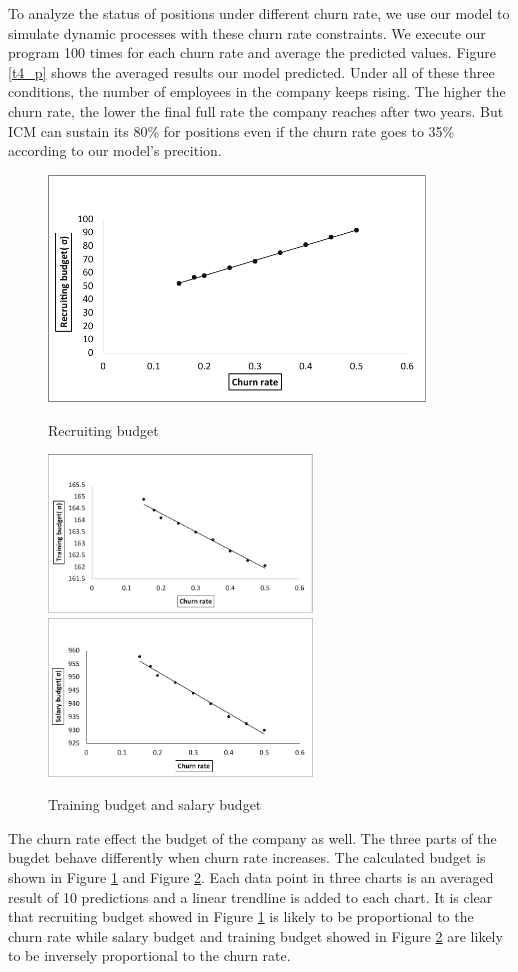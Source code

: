 \documentclass[12pt,a4paper,titlepage]{article}
\begin{document}
To analyze the status of positions under different churn rate, we use
our model to simulate dynamic processes with these churn rate
constraints. We execute our program 100 times for each churn rate and
average the predicted values. Figure \ref{t4_p} shows the averaged
results our model predicted. Under all of these three conditions, the
number of employees in the company keeps rising. The higher the churn
rate, the lower the final full rate the company reaches after two
years. But ICM can sustain its 80\% for positions even if the churn
rate goes to 35\% according to our model's precition.

\begin{figure}[htb]
  \centering
  \includegraphics[width=10cm]{task4_r.pdf}\\
  \caption{Recruiting budget}\label{t4_r}
\end{figure}
\begin{figure}[htb]
  \centering
  \includegraphics[width=7cm]{task4_t.pdf}
  \includegraphics[width=7cm]{task4_s.pdf}\\
  \caption{Training budget and salary budget}\label{t4_t_s}
\end{figure}
The churn rate effect the budget of the company as well. The three
parts of the bugdet behave differently when churn rate increases. The
calculated budget is shown in Figure \ref{t4_r} and Figure
\ref{t4_t_s}. Each data point in three charts is an averaged result of
10 predictions and a linear trendline is added to each chart. It is
clear that recruiting budget showed in Figure \ref{t4_r} is likely to
be proportional to the churn rate while salary budget and training
budget showed in Figure \ref{t4_t_s} are likely to be inversely
proportional to the churn rate.
\end{document}
